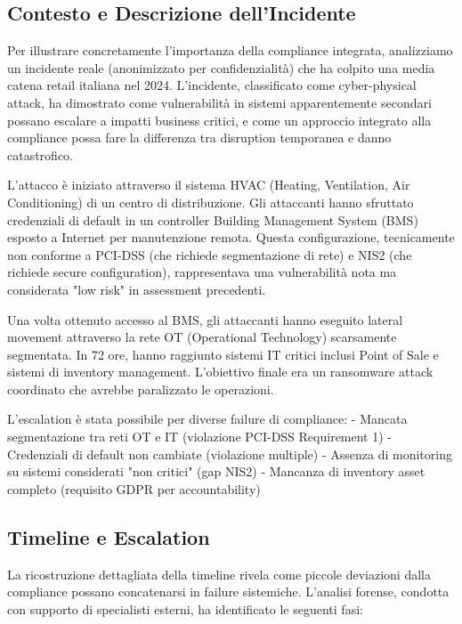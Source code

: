 \subsection{Contesto e Descrizione dell'Incidente}

Per illustrare concretamente l'importanza della compliance integrata, analizziamo un incidente reale (anonimizzato per confidenzialità) che ha colpito una media catena retail italiana nel 2024. L'incidente, classificato come cyber-physical attack, ha dimostrato come vulnerabilità in sistemi apparentemente secondari possano escalare a impatti business critici, e come un approccio integrato alla compliance possa fare la differenza tra disruption temporanea e danno catastrofico.

L'attacco è iniziato attraverso il sistema HVAC (Heating, Ventilation, Air Conditioning) di un centro di distribuzione. Gli attaccanti hanno sfruttato credenziali di default in un controller Building Management System (BMS) esposto a Internet per manutenzione remota. Questa configurazione, tecnicamente non conforme a PCI-DSS (che richiede segmentazione di rete) e NIS2 (che richiede secure configuration), rappresentava una vulnerabilità nota ma considerata "low risk" in assessment precedenti.

Una volta ottenuto accesso al BMS, gli attaccanti hanno eseguito lateral movement attraverso la rete OT (Operational Technology) scarsamente segmentata. In 72 ore, hanno raggiunto sistemi IT critici inclusi Point of Sale e sistemi di inventory management. L'obiettivo finale era un ransomware attack coordinato che avrebbe paralizzato le operazioni.

L'escalation è stata possibile per diverse failure di compliance:
- Mancata segmentazione tra reti OT e IT (violazione PCI-DSS Requirement 1)
- Credenziali di default non cambiate (violazione multiple)
- Assenza di monitoring su sistemi considerati "non critici" (gap NIS2)
- Mancanza di inventory asset completo (requisito GDPR per accountability)

\subsection{Timeline e Escalation}

La ricostruzione dettagliata della timeline rivela come piccole deviazioni dalla compliance possano concatenarsi in failure sistemiche. L'analisi forense, condotta con supporto di specialisti esterni, ha identificato le seguenti fasi:


